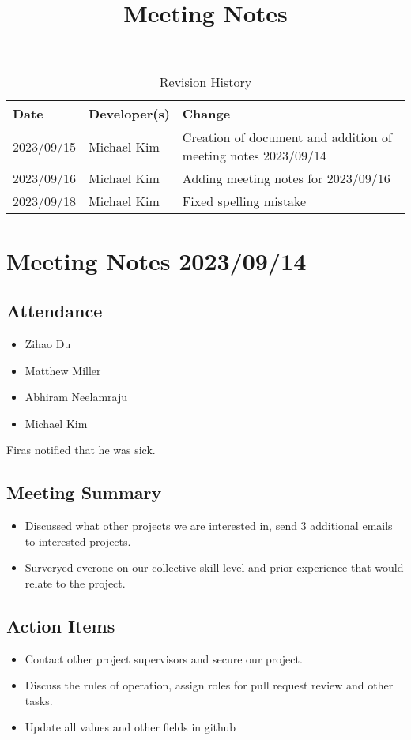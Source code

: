 \documentclass{article}
\title{Meeting Notes\\\progname}
\author{\authname}
\date{}
\begin{document}
\maketitle

\begin{table}[hp]
\caption{Revision History} \label{TblRevisionHistory}
\begin{tabularx}{\textwidth}{llX}
\toprule
\textbf{Date} & \textbf{Developer(s)} & \textbf{Change}\\
\midrule
2023/09/15 & Michael Kim & Creation of document and addition of meeting notes 2023/09/14 \\
2023/09/16 & Michael Kim & Adding meeting notes for 2023/09/16 \\
2023/09/18 & Michael Kim & Fixed spelling mistake\\
\bottomrule
\end{tabularx}
\end{table}

\section*{Meeting Notes 2023/09/14}

\subsection*{Attendance}
\begin{itemize}
\item Zihao Du 
\item Matthew Miller
\item Abhiram Neelamraju
\item Michael Kim
\end{itemize}
Firas notified that he was sick.

\subsection*{Meeting Summary}
\begin{itemize}
\item Discussed what other projects we are interested in, send 3 additional emails to interested projects.
\item Surveryed everone on our collective skill level and prior experience that would relate to the project.
\end{itemize}

\subsection*{Action Items}
\begin{itemize}
\item Contact other project supervisors and secure our project.
\item Discuss the rules of operation, assign roles for pull request review and other tasks.
\item Update all values and other fields in github
\end{itemize}
\end{document}
